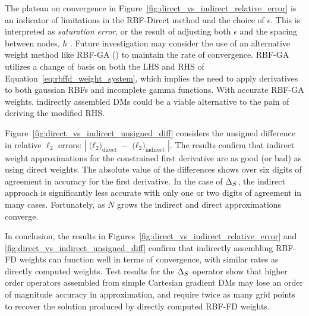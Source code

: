 The plateau on convergence in Figure~\ref{fig:direct_vs_indirect_relative_error} is an indicator of limitations in the RBF-Direct method and the choice of $\epsilon$. This is interpreted as \emph{saturation error}, or the result of adjusting both $\epsilon$ and the spacing between nodes, $h$ \cite{FlyerFornberg11,Fasshauer2007}. Future investigation may consider the use of an alternative weight method like RBF-GA (\cite{Fornberg2012}) to maintain the rate of convergence. RBF-GA utilizes a change of basis on both the LHS and RHS of Equation~\ref{eq:rbffd_weight_system}, which implies the need to apply derivatives to both gaussian RBFs and incomplete gamma functions. With accurate RBF-GA weights, indirectly assembled DMs could be a viable alternative to the pain of deriving the modified RHS. 

Figure~\ref{fig:direct_vs_indirect_unsigned_diff} considers the unsigned difference in relative $\ell_2$ errors: $| \text{($\ell_{2}$)}_{\text{direct}} - \text{($\ell_{2}$)}_{\text{indirect}} |$. The results confirm that indirect weight approximations for the constrained first derivative are as good (or bad) as using direct weights. The absolute value of the differences shows over six digits of agreement in accuracy for the first derivative. In the case of $\Delta_S$, the indirect approach is significantly less accurate with only one or two digits of agreement in many cases. Fortunately, as $N$ grows the indirect and direct approximations converge. 

In conclusion, the results in Figures~\ref{fig:direct_vs_indirect_relative_error} and \ref{fig:direct_vs_indirect_unsigned_diff} confirm that indirectly assembling RBF-FD weights can function well in terms of convergence, with similar rates as directly computed weights. Test results for the $\Delta_S$ operator show that higher order operators assembled from simple Cartesian gradient DMs may lose an order of magnitude accuracy in approximation, and require twice as many grid points to recover the solution produced by directly computed RBF-FD weights. 




